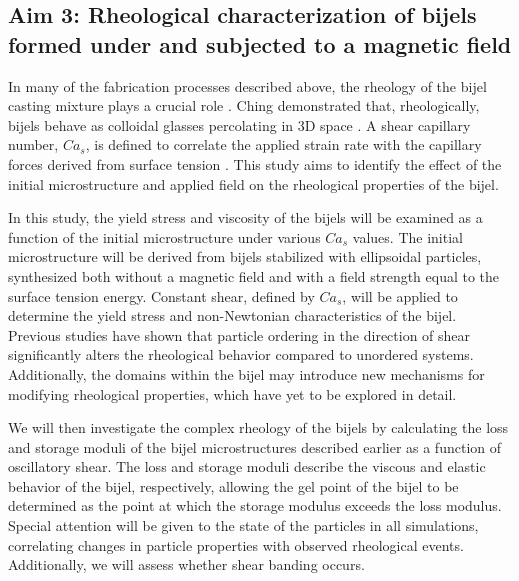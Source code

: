 \subsection{Aim 3: Rheological characterization of bijels formed under and subjected to a magnetic field}
\label{section:aim3_desc}

In many of the fabrication processes described above, the rheology of the bijel casting mixture plays a crucial role 
\cite{haase_continuous_2015, cai_bijels_2017, amirfattahi_fabrication_2024}. Ching demonstrated that, rheologically, bijels behave as colloidal 
glasses percolating in 3D space \cite{ching_bijel_2022}. A shear capillary number, \( Ca_s \), is defined to correlate the applied strain rate 
with the capillary forces derived from surface tension \cite{frijters_effects_2012, yang_capillary_2022}. This study aims to identify the effect 
of the initial microstructure and applied field on the rheological properties of the bijel.


In this study, the yield stress and viscosity of the bijels will be examined as a function of the initial microstructure under various $Ca_s$ values. 
The initial microstructure will be derived from bijels stabilized with ellipsoidal particles, synthesized both without a magnetic field and with a field 
strength equal to the surface tension energy. Constant shear, defined by $Ca_s$, will be applied to determine the yield stress and non-Newtonian 
characteristics of the bijel. Previous studies have shown that particle ordering in the direction of shear significantly alters the rheological behavior 
compared to unordered systems. Additionally, the domains within the bijel may introduce new mechanisms for modifying rheological properties, which have 
yet to be explored in detail.

We will then investigate the complex rheology of the bijels by calculating the loss and storage moduli of the bijel microstructures described 
earlier as a function of oscillatory shear. The loss and storage moduli describe the viscous and elastic behavior of the bijel, respectively, 
allowing the gel point of the bijel to be determined as the point at which the storage modulus exceeds the loss modulus. Special attention will be 
given to the state of the particles in all simulations, correlating changes in particle properties with observed rheological events. Additionally, 
we will assess whether shear banding occurs.